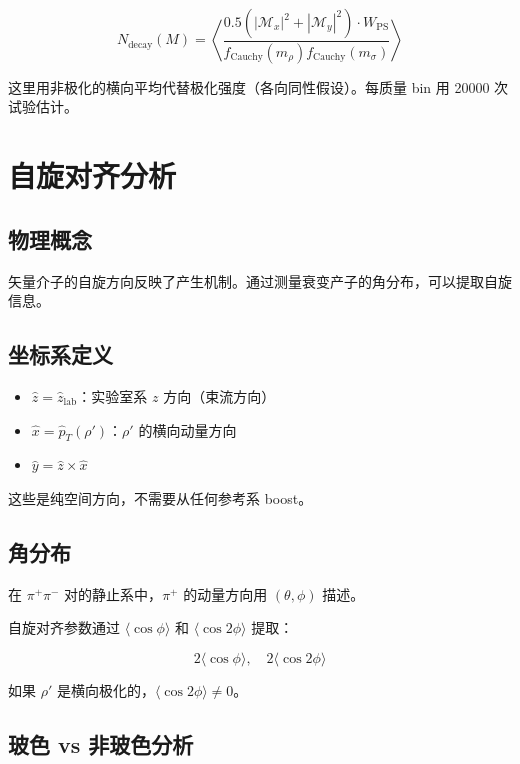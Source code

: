 \documentclass[11pt,a4paper,UTF8]{ctexart}
\begin{document}
\[
N_{\text{decay}}(M) = \left\langle \frac{0.5(|\mathcal{M}_x|^2 + |\mathcal{M}_y|^2) \cdot W_{\text{PS}}}{f_{\text{Cauchy}}(m_\rho) f_{\text{Cauchy}}(m_\sigma)} \right\rangle
\]

这里用非极化的横向平均代替极化强度（各向同性假设）。每质量 bin 用 20000 次试验估计。

\section{自旋对齐分析}

\subsection{物理概念}

矢量介子的自旋方向反映了产生机制。通过测量衰变产子的角分布，可以提取自旋信息。

\subsection{坐标系定义}

\begin{itemize}[leftmargin=2em]
    \item $\hat{z} = \hat{z}_{\text{lab}}$：实验室系 $z$ 方向（束流方向）
    \item $\hat{x} = \hat{p}_T(\rho')$：$\rho'$ 的横向动量方向
    \item $\hat{y} = \hat{z} \times \hat{x}$
\end{itemize}

这些是纯空间方向，不需要从任何参考系 boost。

\subsection{角分布}

在 $\pi^+\pi^-$ 对的静止系中，$\pi^+$ 的动量方向用 $(\theta, \phi)$ 描述。

自旋对齐参数通过 $\langle \cos\phi \rangle$ 和 $\langle \cos 2\phi \rangle$ 提取：

\[
2\langle \cos\phi \rangle, \quad 2\langle \cos 2\phi \rangle
\]

如果 $\rho'$ 是横向极化的，$\langle \cos 2\phi \rangle \neq 0$。

\subsection{玻色 vs 非玻色分析}
\end{document}

